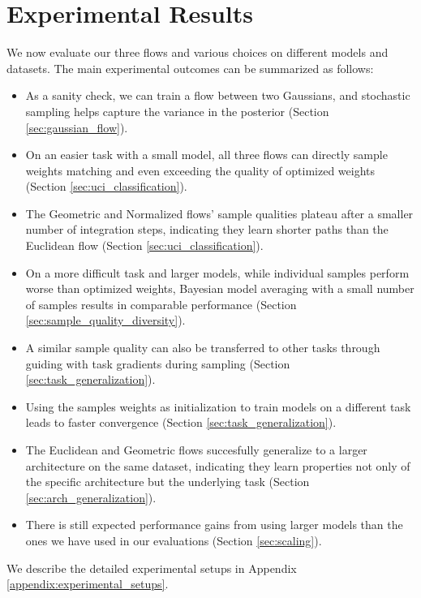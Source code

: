 
\chapter{Experimental Results}\label{chapter:results}

We now evaluate our three flows and various choices on different models and datasets. The main experimental outcomes can be summarized as follows:
\begin{itemize}
    \item As a sanity check, we can train a flow between two Gaussians, and stochastic sampling helps capture the variance in the posterior (Section \ref{sec:gaussian_flow}).
    \item On an easier task with a small model, all three flows can directly sample weights matching and even exceeding the quality of optimized weights (Section \ref{sec:uci_classification}).
    \item The Geometric and Normalized flows' sample qualities plateau after a smaller number of integration steps, indicating they learn shorter paths than the Euclidean flow (Section \ref{sec:uci_classification}).
    \item On a more difficult task and larger models, while individual samples perform worse than optimized weights, Bayesian model averaging with a small number of samples results in comparable performance (Section \ref{sec:sample_quality_diversity}).
    \item A similar sample quality can also be transferred to other tasks through guiding with task gradients during sampling (Section \ref{sec:task_generalization}).
    \item Using the samples weights as initialization to train models on a different task leads to faster convergence (Section \ref{sec:task_generalization}).
    \item The Euclidean and Geometric flows succesfully generalize to a larger architecture on the same dataset, indicating they learn properties not only of the specific architecture but the underlying task (Section \ref{sec:arch_generalization}).
    \item There is still expected performance gains from using larger models than the ones we have used in our evaluations (Section \ref{sec:scaling}).
\end{itemize}

We describe the detailed experimental setups in Appendix \ref{appendix:experimental_setups}.

